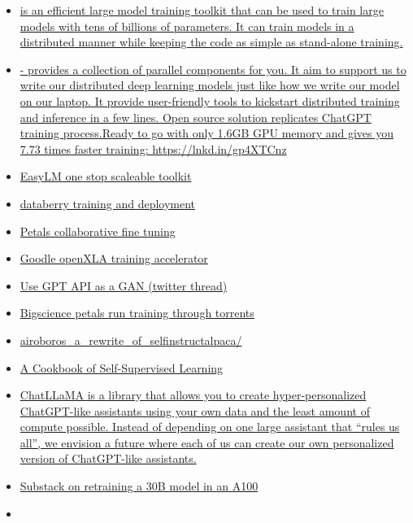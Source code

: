 \begin{itemize}
{  hidden layer across columns of processors." Mesh TensorFlow is
  implemented as a layer over TensorFlow.}
\item
  \href{https://github.com/OpenBMB/BMTrain}{        is an efficient
  large model training toolkit that can be used to train large models
  with tens of billions of parameters. It can train models in a
  distributed manner while keeping the code as simple as stand-alone
  training.}
\item
  \href{https://colossalai.org/}{        -   provides a collection of
  parallel components for you. It aim to support us to write our
  distributed deep learning models just like how we write our model on
  our laptop. It provide user-friendly tools to kickstart distributed
  training and inference in a few lines.  Open source solution
  replicates ChatGPT training process.Ready to go with only 1.6GB GPU
  memory and gives you 7.73 times faster training:
  https://lnkd.in/gp4XTCnz}
\item
  \href{https://github.com/young-geng/EasyLM}{EasyLM one stop scaleable
  toolkit}
\item
  \href{https://github.com/gmpetrov/databerry}{databerry training and
  deployment}
\item
  \href{https://arxiv.org/abs/2209.01188}{Petals collaborative fine
  tuning}
\item
  \href{https://opensource.googleblog.com/2023/03/openxla-is-ready-to-accelerate-and-simplify-ml-development.html}{Goodle
  openXLA training accelerator}
\item
  \href{https://twitter.com/BrianRoemmele/status/1637871062246649856}{Use
  GPT API as a GAN (twitter thread)}
\item
  \href{https://github.com/bigscience-workshop/petals}{Bigscience petals
  run training through torrents}
\item
  \href{https://www.reddit.com/r/MachineLearning/comments/136vt7b/p_airoboros_a_rewrite_of_selfinstructalpaca/}{airoboros\_a\_rewrite\_of\_selfinstructalpaca/}
\item
  \href{https://arxiv.org/abs/2304.12210}{A Cookbook of Self-Supervised
  Learning}
\item
  \href{https://github.com/nebuly-ai/nebullvm/tree/main/apps/accelerate/chatllama}{ChatLLaMA
  is a library that allows you to create hyper-personalized ChatGPT-like
  assistants using your own data and the least amount of compute
  possible. Instead of depending on one large assistant that ``rules us
  all'', we envision a future where each of us can create our own
  personalized version of ChatGPT-like assistants.}
\item
  \href{https://abuqader.substack.com/p/releasing-alpaca-30b}{Substack
  on retraining a 30B model in an A100}
\item
  \href{https://github.com/alpa-projects/alpa}{}


\end{itemize}
